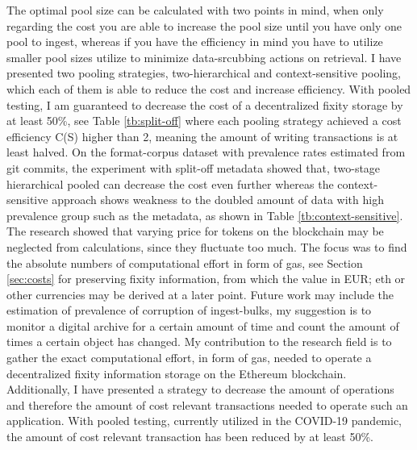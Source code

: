 The optimal pool size can be calculated with two points in mind, when only regarding the cost you are able to increase the pool size until you have only one pool to ingest, whereas if you have the efficiency in mind you have to utilize smaller pool sizes utilize to minimize data-srcubbing actions on retrieval. I have presented two pooling strategies, two-hierarchical and context-sensitive pooling, which each of them is able to reduce the cost and increase efficiency. With pooled testing, I am guaranteed to decrease the cost of a decentralized fixity storage by at least 50\%, see Table \ref{tb:split-off} where each pooling strategy achieved a cost efficiency C(S) higher than 2, meaning the amount of writing transactions is at least halved. On the format-corpus dataset with prevalence rates estimated from git commits, the experiment with split-off metadata showed that, two-stage hierarchical pooled can decrease the cost even further whereas the context-sensitive approach shows weakness to the doubled amount of data with  high prevalence group such as the metadata, as shown in Table \ref{tb:context-sensitive}.
The research showed that varying price for tokens on the blockchain may be neglected from calculations, since they fluctuate too much. The focus was to find the absolute numbers of computational effort in form of gas, see Section \ref{sec:costs} for preserving fixity information, from which the value in EUR; \acrshort{eth} or other currencies may be derived at a later point. 
Future work may include the estimation of prevalence of corruption of ingest-bulks, my suggestion is to monitor a digital archive for a certain amount of time and count the amount of times a certain object has changed. 
My contribution to the research field is to gather the exact computational effort, in form of gas, needed to operate a decentralized fixity information storage on the Ethereum blockchain. Additionally, I have presented a strategy to decrease the amount of operations and therefore the amount of cost relevant transactions needed to operate such an application. With pooled testing, currently utilized in the COVID-19 pandemic, the amount of cost relevant \gls{transaction} has been reduced by at least 50\%.